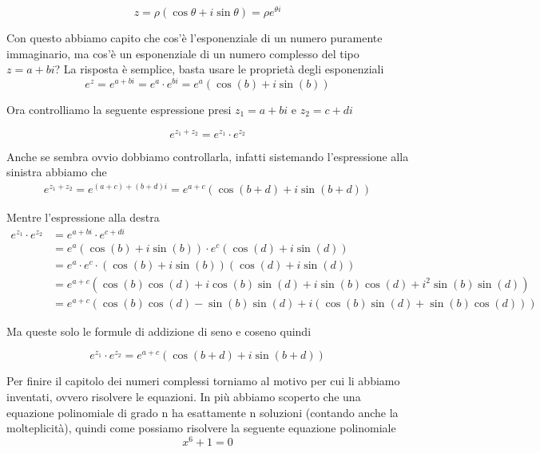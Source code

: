 \documentclass{rapport}
\begin{document}
\[
z = \rho (\cos\theta + i \sin\theta) = \rho e^{\theta i} 
\]

Con questo abbiamo capito che cos'è l'esponenziale di un numero puramente immaginario, ma cos'è un esponenziale di un numero complesso del tipo $z=a+bi$? La risposta è semplice, basta usare le proprietà degli esponenziali
\[
e^{z} = e^{a+bi} = e^{a} \cdot e^{bi} = e^{a} \left(\cos(b)+i\sin(b)\right)
\]

Ora controlliamo la seguente espressione presi $z_1 = a+bi$ e $z_2 = c+di$

\[
e^{z_1+z_2} = e^{z_1} \cdot e^{z_2}
\]

Anche se sembra ovvio dobbiamo controllarla, infatti sistemando l'espressione alla sinistra abbiamo che
\begin{align*}
  e^{z_1+z_2} = e^{(a+c) + (b+d)i} = e^{a+c} \left(\cos(b+d) + i \sin(b+d)\right)
\end{align*}

Mentre l'espressione alla destra 
\begin{align*}
  e^{z_1} \cdot e^{z_2} &= e^{a+bi} \cdot e^{c+di} \\
  &= e^{a} \left(\cos(b)+i\sin(b)\right) \cdot e^{c} \left(\cos(d)+i\sin(d)\right) \\
  &= e^{a} \cdot e^{c} \cdot \left(\cos(b)+i\sin(b)\right) \left(\cos(d)+i\sin(d)\right) \\
  &= e^{a+c} \left(\cos(b)\cos(d)+i\cos(b)\sin(d)+i\sin(b)\cos(d) + i^2\sin(b)\sin(d)\right) \\
  &= e^{a+c} \left(\cos(b)\cos(d)-\sin(b)\sin(d)+i(\cos(b)\sin(d)+\sin(b)\cos(d)) \right)
\end{align*}


Ma queste solo le formule di addizione di seno e coseno quindi 

\[
e^{z_1} \cdot e^{z_2}  = e^{a+c} \left(\cos(b+d) + i\sin(b+d) \right)
\]

Per finire il capitolo dei numeri complessi torniamo al motivo per cui li abbiamo inventati, ovvero risolvere le equazioni. In più abbiamo scoperto che una equazione polinomiale di grado n ha esattamente n soluzioni (contando anche la molteplicità), quindi come possiamo risolvere la seguente equazione polinomiale
\[
x^6+1=0
\] 
\end{document}
